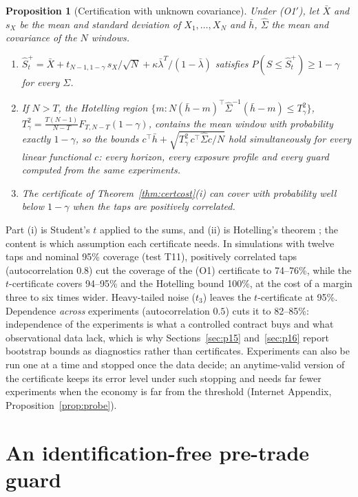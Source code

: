\documentclass[12pt]{article}
\newtheorem{proposition}[theorem]{Proposition}
\theoremstyle{definition}
\theoremstyle{remark}
\begin{document}
\begin{proposition}[Certification with unknown covariance]\label{prop:hotelling}
Under (O1$'$), let $\bar X$ and $s_X$ be the mean and standard deviation of $X_1,\ldots,X_N$ and $\bar h$, $\hat\Sigma$ the mean and covariance of the $N$ windows.
\begin{enumerate}[label=(\roman*)]
\item $\hat S^+_t=\bar X+t_{N-1,1-\gamma}\,s_X/\sqrt N+\kappa\bar\lambda^T/(1-\bar\lambda)$ satisfies $P(S\le\hat S^+_t)\ge1-\gamma$ for every $\Sigma$.
\item If $N>T$, the Hotelling region $\{m:N(\bar h-m)^\top\hat\Sigma^{-1}(\bar h-m)\le T^2_\gamma\}$, $T^2_\gamma=\frac{T(N-1)}{N-T}F_{T,N-T}(1-\gamma)$, contains the mean window with probability exactly $1-\gamma$, so the bounds $c^\top\bar h+\sqrt{T^2_\gamma\,c^\top\hat\Sigma c/N}$ hold simultaneously for every linear functional $c$: every horizon, every exposure profile and every guard computed from the same experiments.
\item The certificate of Theorem~\ref{thm:certcost}(i) can cover with probability well below $1-\gamma$ when the taps are positively correlated.
\end{enumerate}
\end{proposition}

Part (i) is Student's $t$ applied to the sums, and (ii) is Hotelling's theorem \citep{hotelling1931}; the content is which assumption each certificate needs. In simulations with twelve taps and nominal 95\% coverage (test T11), positively correlated taps (autocorrelation $0.8$) cut the coverage of the (O1) certificate to 74--76\%, while the $t$-certificate covers 94--95\% and the Hotelling bound 100\%, at the cost of a margin three to six times wider. Heavy-tailed noise ($t_3$) leaves the $t$-certificate at 95\%. Dependence \emph{across} experiments (autocorrelation $0.5$) cuts it to 82--85\%: independence of the experiments is what a controlled contract buys and what observational data lack, which is why Sections~\ref{sec:p15} and~\ref{sec:p16} report bootstrap bounds as diagnostics rather than certificates. Experiments can also be run one at a time and stopped once the data decide; an anytime-valid version of the certificate keeps its error level under such stopping and needs far fewer experiments when the economy is far from the threshold (Internet Appendix, Proposition~\ref{prop:probe}).
\section{An identification-free pre-trade guard}\label{sec:guard}
\end{document}
